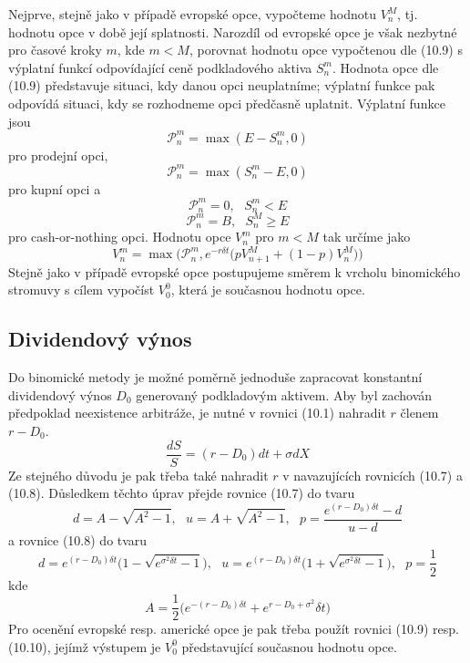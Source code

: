 \documentclass[a4paper]{book}
\begin{document}
Nejprve, stejně jako v případě evropské opce, vypočteme hodnotu $V_n^M$, tj. hodnotu opce v době její splatnosti. Narozdíl od evropské opce je však nezbytné pro časové kroky $m$, kde $m < M$, porovnat hodnotu opce vypočtenou dle (10.9) s výplatní funkcí odpovídající ceně podkladového aktiva $S_n^m$. Hodnota opce dle (10.9) představuje situaci, kdy danou opci neuplatníme; výplatní funkce pak odpovídá situaci, kdy se rozhodneme opci předčasně uplatnit. Výplatní funkce jsou
\begin{equation*}
\mathcal{P}_n^m = \max(E - S_n^m, 0)
\end{equation*}
pro prodejní opci,
\begin{equation*}
\mathcal{P}_n^m = \max(S_n^m - E, 0)
\end{equation*}
pro kupní opci a
\begin{equation*}
\mathcal{P}_n^m = 0, ~~~ S_n^m < E
\end{equation*}
\begin{equation*}
\mathcal{P}_n^m = B, ~~~ S_n^M \ge E
\end{equation*}
pro cash-or-nothing opci. Hodnotu opce $V_n^m$ pro $m < M$ tak určíme jako
\begin{equation}
V_n^m = \max \Big( \mathcal{P}_n^m, e^{-r \delta t} \Big( pV_{n+1}^M + (1-p)V_n^{M} \Big) \Big)
\end{equation}
Stejně jako v případě evropské opce postupujeme směrem k vrcholu binomického stromuvy s cílem vypočíst $V_0^0$, která je současnou hodnotu opce.

\subsection{Dividendový výnos}

Do binomické metody je možné poměrně jednoduše zapracovat konstantní dividendový výnos $D_0$ generovaný podkladovým aktivem. Aby byl zachován předpoklad neexistence arbitráže, je nutné v rovnici (10.1) nahradit $r$ členem $r - D_0$.
\begin{equation*}
\frac{d S}{S} = (r - D_0)dt + \sigma dX
\end{equation*}
Ze stejného důvodu je pak třeba také nahradit $r$ v navazujících rovnicích (10.7) a (10.8). Důsledkem těchto úprav přejde rovnice (10.7) do tvaru
\begin{equation*}
d = A - \sqrt{A^2 - 1},~~~u = A + \sqrt{A^2 - 1},~~~p = \frac{e^{(r - D_0) \delta t} - d}{u - d}
\end{equation*}
a rovnice (10.8) do tvaru
\begin{equation*}
d = e^{(r - D_0) \delta t}\Big( 1 - \sqrt{e^{\sigma^2 \delta t} - 1} \Big), ~~~ u = e^{(r - D_0) \delta t}\Big( 1 + \sqrt{e^{\sigma^2 \delta t} - 1} \Big), ~~~ p = \frac{1}{2}
\end{equation*}
kde
\begin{equation*}
A = \frac{1}{2}\Big( e^{-(r - D_0) \delta t} + e^{r - D_0 + \sigma^2}\delta t \Big)
\end{equation*}
Pro ocenění evropské resp. americké opce je pak třeba použít rovnici (10.9) resp. (10.10), jejímž výstupem je $V_0^0$ představující současnou hodnotu opce.
\end{document}
